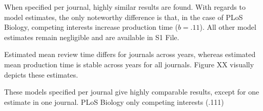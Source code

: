 When specified per journal, highly similar results are found. With regards to model estimates, the only noteworthy difference is that, in the case of PLoS Biology, competing interests increase production time ($b=.11$). All other model estimates remain negligible and are available in S1 File.

Estimated mean review time differs for journals across years, whereas estimated mean production time is stable across years for all journals. Figure XX visually depicts these estimates. 

These models specified per journal give highly comparable results, except for one estimate in one journal. PLoS Biology only competing interests (.111)